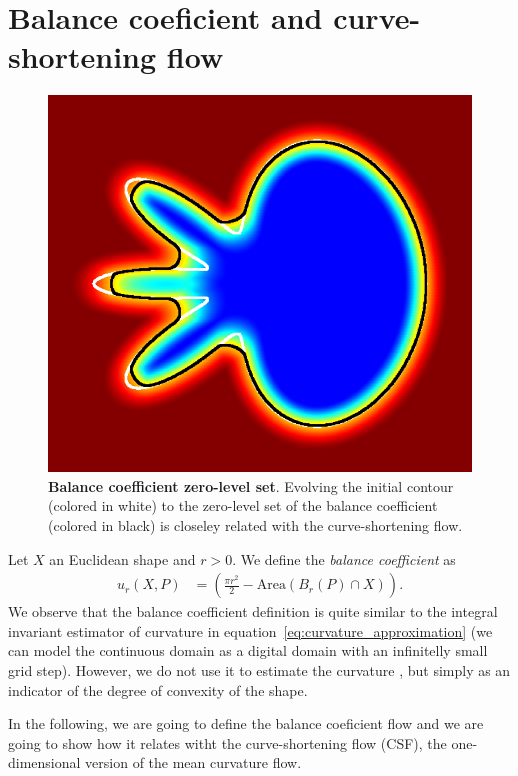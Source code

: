 \documentclass[smallextended]{svjour3}
\begin{document}
\section{Balance coeficient and curve-shortening flow}
%
%
\begin{figure}
 \center
 \includegraphics[scale=0.32]{figures/zero-level-set/balance-coefficient-zero-level-set.png}
 \caption{\textbf{Balance coefficient zero-level set}. Evolving the initial contour (colored in white) to the zero-level set of the balance coefficient (colored in black) is closeley related with the curve-shortening flow.}
 \label{fig:balance-coefficient-zero-level-set}
 \end{figure}
%
%
Let $X$ an Euclidean shape and $r>0$. We define the \emph{balance coefficient} as
%
%
\begin{align*}
	u_r(X,P) &= \left( \frac{\pi r^2}{2} - \text{Area}(B_r(P) \cap X) \right).
\end{align*}
%
%
 We observe that the balance coefficient definition is quite similar to the integral invariant estimator of curvature in equation~\eqref{eq:curvature_approximation} (we can model the continuous domain as a digital domain with an infinitelly small grid step). However, we do not use it to estimate the curvature , but simply as an indicator of the degree of convexity of the shape.

In the following, we are going to define the balance coeficient flow and we are going to show how it relates witht the curve-shortening flow (CSF), the one-dimensional version of the mean curvature flow.
\end{document}
